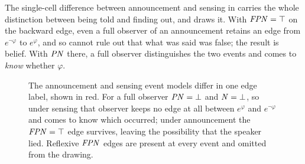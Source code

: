 \documentclass[11pt,a4paper]{article}
\begin{document}
The single-cell difference between announcement and sensing in 
carries the whole distinction between being told and finding out, and 
draws it. With $\mathit{FPN} = \top$ on the backward edge, even a full observer of an announcement
retains an edge from $e^{\neg\varphi}$ to $e^{\varphi}$, and so cannot rule out that what was
said was false; the result is belief. With $\mathit{PN}$ there, a full observer distinguishes the two
events and comes to \emph{know} whether $\varphi$.

\begin{figure}[t]
\centering
{}
\caption{The announcement and sensing event models differ in one edge label, shown in red.
For a full observer $\mathit{PN} = \bot$ and $\mathit{N} = \bot$, so under sensing that observer keeps no
edge at all between $e^{\varphi}$ and $e^{\neg\varphi}$ and comes to know which occurred;
under announcement the $\mathit{FPN} = \top$ edge survives, leaving the possibility that the speaker
lied. Reflexive $\mathit{FPN}$ edges are present at every event and omitted from the drawing.}
\label{fig:events}
\end{figure}
\end{document}

